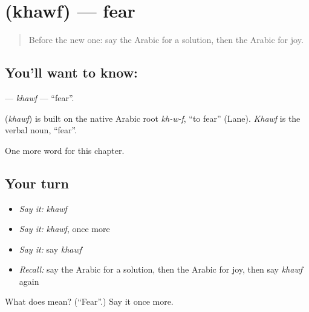 \section[\texorpdfstring{\ar{خوف} (khawf)}{خوف (khawf)}]{ (khawf) — fear}

\label{lesson:AR-C206-khawf}



\begin{quote}
Before the new one: say the Arabic for a solution, then the Arabic for joy.
\end{quote}

\subsection*{You'll want to know: }
\textbf{} — \emph{khawf} — \textquotedblleft{}fear\textquotedblright{}.

\begin{cousinweb}
\textbf{} (\emph{khawf}) is built on the native Arabic root \emph{kh-w-f}, \textquotedblleft{}to fear\textquotedblright{} (Lane). \emph{Khawf} is the verbal noun, \textquotedblleft{}fear\textquotedblright{}.
\end{cousinweb}

\begin{grammarlens}[title={What you've built}]
One more word for this chapter.
\end{grammarlens}

\subsection*{Your turn}
\begin{itemize}
\raggedright
  \item \emph{Say it:} \emph{khawf}
  \item \emph{Say it:} \emph{khawf}, once more
  \item \emph{Say it:} say \emph{khawf}
  \item \emph{Recall:} say the Arabic for a solution, then the Arabic for joy, then say \emph{khawf} again
\end{itemize}

\begin{tcolorbox}[breakable,colback=teal!4,colframe=teal!35!black,title={Before you move on}]
What does  mean? (\textquotedblleft{}Fear\textquotedblright{}.) Say it once more.
\end{tcolorbox}
